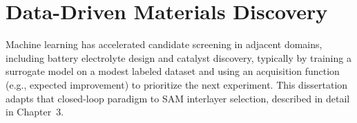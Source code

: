 \section{Data-Driven Materials Discovery}

Machine learning has accelerated candidate screening in adjacent domains,
including battery electrolyte design and catalyst discovery, typically by
training a surrogate model on a modest labeled dataset and using an
acquisition function (e.g., expected improvement) to prioritize the next
experiment. This dissertation adapts that closed-loop paradigm to SAM
interlayer selection, described in detail in Chapter~3.
